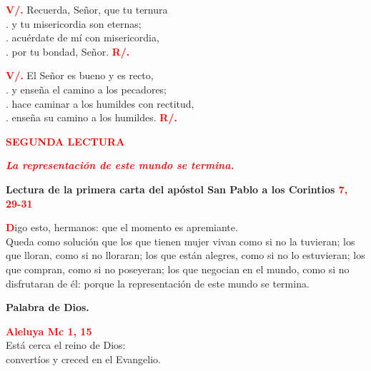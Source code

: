 \documentclass[12pt, letterpaper]{report}
\begin{document}
{\bfseries \textcolor{red}{V/.}} \hspace{1cm} Recuerda, Se\~nor, que tu ternura\\
. \hspace{2.5cm} y tu misericordia son eternas;\\
. \hspace{2.5cm} acu\'erdate de m\'i con misericordia,\\
. \hspace{2.5cm} por tu bondad, Se\~nor.
\hspace{1cm} {\bfseries \textcolor{red}{R/.}}

{\bfseries \textcolor{red}{V/.}} \hspace{1cm} El Se\~nor es bueno y es recto,\\
. \hspace{2.5cm} y ense\~na el camino a los pecadores;\\
. \hspace{2.5cm} hace caminar a los humildes con rectitud,\\
. \hspace{2.5cm} ense\~na su camino a los humildes.
\hspace{1cm} {\bfseries \textcolor{red}{R/.}}

\begin{center}
\Large {\bfseries \textcolor{red}{SEGUNDA LECTURA}}
\end{center}

\begin{center}
\large {\bfseries \textit{ \textcolor{red}{La representaci\'on de este mundo se termina.}}}
\end{center}

\Large {\bfseries Lectura de la primera carta del ap\'ostol San Pablo a los Corintios \hspace{1cm} \textcolor{red}{7, 29-31}}

\lettrine[lines=2]{\bfseries \textcolor{red}{D}}{}\Large igo esto, hermanos: que el momento es apremiante.\\
Queda como soluci\'on que los que tienen mujer vivan como si no la tuvieran; los que lloran, como si no lloraran; los que est\'an alegres, como si no lo estuvieran; los que compran, como si no poseyeran; los que negocian en el mundo, como si no disfrutaran de \'el: porque la representaci\'on de este mundo se termina.

{\bfseries Palabra de Dios.}

\newpage

\begin{center}
\Large {\bfseries \textcolor{red}{Aleluya \hspace{1cm} Mc 1, 15}}\\
Est\'a cerca el reino de Dios:\\
convert\'ios y creced en el Evangelio.
\end{center}
\end{document}
